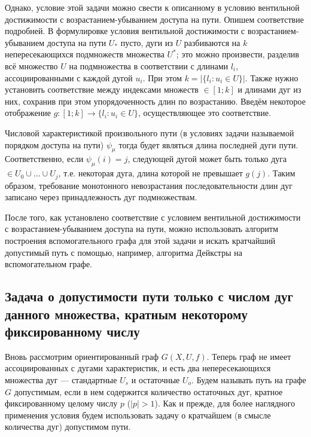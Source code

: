 Однако, условие этой задачи можно свести к описанному в \cite{Mono} условию вентильной достижимости с возрастанием-убыванием доступа на пути. Опишем соответствие подробней. В формулировке условия вентильной достижимости с возрастанием-убыванием доступа на пути $U_*$ пусто, дуги из $U$ разбиваются на $k$ непересекающихся подмножеств множества $U^*$; это можно произвести, разделив всё множество $U$ на подмножества в соответствии с длинами $l_i$, ассоциированными с каждой дугой $u_i$. При этом $k = |\{ l_i : u_i \in U\}|$. Также нужно установить соответствие между индексами множеств $\in [1; k]$ и длинами дуг из них, сохранив при этом упорядоченность длин по возрастанию. Введём некоторое отображение $g:[1; k]\to \{ l_i : u_i \in U\}$, осуществляющее это соответствие. 

Числовой характеристикой произвольного пути (в условиях задачи называемой порядком доступа на пути) $\psi_\mu$ тогда будет являться длина последней дуги пути. Соответственно, если $\psi_\mu(i) = j$, следующей дугой может быть только дуга $\in U_0 \cup ... \cup U_j$, т.е. некоторая дуга, длина которой не превышает $g(j)$. Таким образом, требование монотонного невозрастания последовательности длин дуг записано через принадлежность дуг подмножествам. 

После того, как установлено соответствие с условием вентильной достижимости с возрастанием-убыванием доступа на пути, можно использовать алгоритм построения вспомогательного графа для этой задачи и искать кратчайший допустимый путь с помощью, например, алгоритма Дейкстры на вспомогательном графе. 

\subsection{Задача о допустимости пути только с числом дуг данного множества, кратным некоторому фиксированному числу}

Вновь рассмотрим ориентированный граф $G(X,U,f)$. Теперь граф не имеет ассоциированных с дугами характеристик, и есть два непересекающихся множества дуг --- стандартные $U_s$ и остаточные $U_o$. Будем называть путь на графе $G$ допустимым, если в нем содержится количество остаточных дуг, кратное фиксированному целому числу $p$ ($|p| > 1$). Как и прежде, для более наглядного применения условия будем использовать задачу о  кратчайшем (в смысле количества дуг) допустимом пути.

